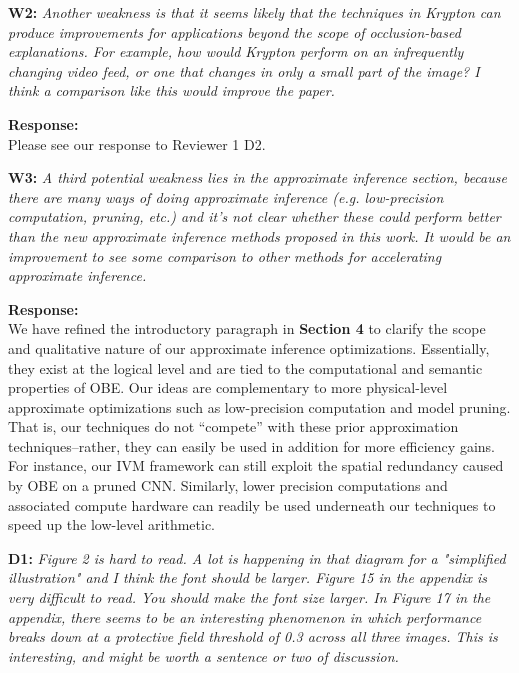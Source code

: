 \documentclass[preprint]{vldb}
\begin{document}
\vspace{2mm}
\noindent \textbf{W2:} \textit{Another weakness is that it seems likely that the techniques in Krypton can produce improvements for applications beyond the scope of occlusion-based explanations. For example, how would Krypton perform on an infrequently changing video feed, or one that changes in only a small part of the image? I think a comparison like this would improve the paper.}

\vspace{2mm}
\noindent \textbf{Response:}\\
Please see our response to Reviewer 1 D2.

\vspace{2mm}
\noindent \textbf{W3:} \textit{A third potential weakness lies in the approximate inference section, because there are many ways of doing approximate inference (e.g. low-precision computation, pruning, etc.) and it's not clear whether these could perform better than the new approximate inference methods proposed in this work. It would be an improvement to see some comparison to other methods for accelerating approximate inference.}

\vspace{2mm}
\noindent \textbf{Response:}\\
We have refined the introductory paragraph in \textbf{Section 4} to clarify the scope and qualitative nature of our approximate inference optimizations. Essentially, they exist at the logical level and are tied to the computational and semantic properties of OBE. Our ideas are complementary to more physical-level approximate optimizations such as low-precision computation and model pruning. That is, our techniques do not ``compete'' with these prior approximation techniques--rather, they can easily be used in addition for more efficiency gains. For instance, our  IVM framework can still exploit the spatial redundancy caused by OBE on a pruned CNN. Similarly, lower precision computations and associated compute hardware can readily be used underneath our techniques to speed up the low-level arithmetic.


\vspace{2mm}
\noindent \textbf{D1:} \textit{Figure 2 is hard to read. A lot is happening in that diagram for a "simplified illustration" and I think the font should be larger. Figure 15 in the appendix is very difficult to read. You should make the font size larger. In Figure 17 in the appendix, there seems to be an interesting phenomenon in which performance breaks down at a protective field threshold of 0.3 across all three images. This is interesting, and might be worth a sentence or two of discussion.}
\end{document}
